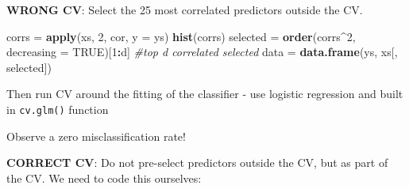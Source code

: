 \documentclass[]{article}
\newenvironment{Shaded}{\begin{snugshade}}{\end{snugshade}}
\newcommand{\CommentTok}[1]{\textcolor[rgb]{0.56,0.35,0.01}{\textit{#1}}}
\newcommand{\ControlFlowTok}[1]{\textcolor[rgb]{0.13,0.29,0.53}{\textbf{#1}}}
\newcommand{\DataTypeTok}[1]{\textcolor[rgb]{0.13,0.29,0.53}{#1}}
\newcommand{\DecValTok}[1]{\textcolor[rgb]{0.00,0.00,0.81}{#1}}
\newcommand{\FloatTok}[1]{\textcolor[rgb]{0.00,0.00,0.81}{#1}}
\newcommand{\KeywordTok}[1]{\textcolor[rgb]{0.13,0.29,0.53}{\textbf{#1}}}
\newcommand{\NormalTok}[1]{#1}
\newcommand{\OperatorTok}[1]{\textcolor[rgb]{0.81,0.36,0.00}{\textbf{#1}}}
\newcommand{\OtherTok}[1]{\textcolor[rgb]{0.56,0.35,0.01}{#1}}
\newcommand{\StringTok}[1]{\textcolor[rgb]{0.31,0.60,0.02}{#1}}
\begin{document}
\textbf{WRONG CV}: Select the 25 most correlated predictors outside the
CV.

\begin{Shaded}
\begin{Highlighting}[]
\NormalTok{corrs =}\StringTok{ }\KeywordTok{apply}\NormalTok{(xs, }\DecValTok{2}\NormalTok{, cor, }\DataTypeTok{y =}\NormalTok{ ys)}
\KeywordTok{hist}\NormalTok{(corrs)}
\NormalTok{selected =}\StringTok{ }\KeywordTok{order}\NormalTok{(corrs}\OperatorTok{^}\DecValTok{2}\NormalTok{, }\DataTypeTok{decreasing =} \OtherTok{TRUE}\NormalTok{)[}\DecValTok{1}\OperatorTok{:}\NormalTok{d]  }\CommentTok{#top d correlated selected}
\NormalTok{data =}\StringTok{ }\KeywordTok{data.frame}\NormalTok{(ys, xs[, selected])}
\end{Highlighting}
\end{Shaded}

Then run CV around the fitting of the classifier - use logistic
regression and built in \texttt{cv.glm()} function

\begin{Shaded}
\end{Shaded}

Observe a zero misclassification rate!

\textbf{CORRECT CV}: Do not pre-select predictors outside the CV, but as
part of the CV. We need to code this ourselves:
\end{document}
